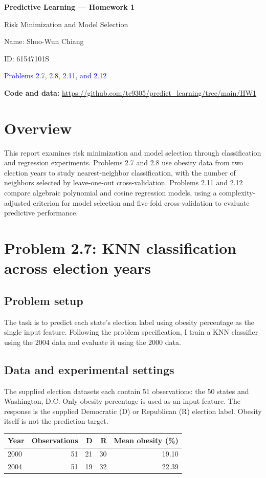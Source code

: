 \documentclass[11pt,a4paper]{article}
\begin{document}
{\LARGE\bfseries\color{navy} Predictive Learning --- Homework 1}\par
{\Large Risk Minimization and Model Selection}\par
Name: Shuo-Wun Chiang\par
ID: 61547101S\par
\textcolor{blue}{Problems 2.7, 2.8, 2.11, and 2.12}
\par\textbf{Code and data:} \url{https://github.com/tc9305/predict_learning/tree/main/HW1}

\section*{Overview}
This report examines risk minimization and model selection through classification and regression experiments. Problems 2.7 and 2.8 use obesity data from two election years to study nearest-neighbor classification, with the number of neighbors selected by leave-one-out cross-validation. Problems 2.11 and 2.12 compare algebraic polynomial and cosine regression models, using a complexity-adjusted criterion for model selection and five-fold cross-validation to evaluate predictive performance.

\section*{Problem 2.7: KNN classification across election years}
\subsection*{Problem setup}
The task is to predict each state's election label using obesity percentage as the single input feature. Following the problem specification, I train a KNN classifier using the 2004 data and evaluate it using the 2000 data.

\subsection*{Data and experimental settings}
The supplied election datasets each contain 51 observations: the 50 states and Washington, D.C. Only obesity percentage is used as an input feature. The response is the supplied Democratic (D) or Republican (R) election label. Obesity itself is not the prediction target.

\begin{center}\begin{tabular}{lrrrr}
\toprule
Year & Observations & D & R & Mean obesity (\%)\\\midrule
2000 & 51 & 21 & 30 & 19.10\\
2004 & 51 & 19 & 32 & 22.39\\\bottomrule
\end{tabular}\end{center}
\end{document}
